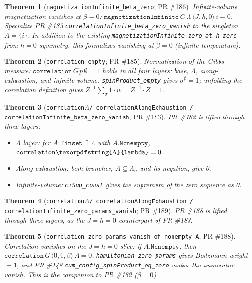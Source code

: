 \documentclass[a4paper,11pt]{article}
\newtheorem{theorem}{Theorem}
\newcommand{\LeanLambda}{\texorpdfstring{\ensuremath{\Lambda}}{Lambda}}
\begin{document}
\begin{theorem}[\texttt{magnetizationInfinite\_beta\_zero}; PR \#186]
Infinite-volume magnetization vanishes at $\beta = 0$:
$\texttt{magnetizationInfinite}\,G\,\Lambda\,\langle J, h, 0\rangle\,i = 0$.
Specialize PR \#183 \texttt{correlationInfinite\_beta\_zero\_vanish} to the
singleton $A = \{i\}$. In addition to the existing
\texttt{magnetizationInfinite\_zero\_at\_h\_zero} from $h=0$ symmetry, this
formalizes vanishing at $\beta = 0$ (infinite temperature).
\end{theorem}

\begin{theorem}[\texttt{correlation\_empty}; PR \#185]
Normalization of the Gibbs measure:
$\texttt{correlation}\,G\,p\,\emptyset = 1$
holds in all four layers: base, $\Lambda$, along-exhaustion, and
infinite-volume. \texttt{spinProduct\_empty} gives $\sigma^\emptyset = 1$;
unfolding the correlation definition gives
$Z^{-1} \sum_\sigma 1 \cdot w = Z^{-1} \cdot Z = 1$.
\end{theorem}

\begin{theorem}[\texttt{correlation\LeanLambda / correlationAlongExhaustion / correlationInfinite\_beta\_zero\_vanish}; PR \#183]
PR \#182 is lifted through three layers:
\begin{itemize}
\item $\Lambda$ layer: for $A : \texttt{Finset}\,\uparrow\Lambda$ with
  $A.\texttt{Nonempty}$, $\texttt{correlation\LeanLambda} = 0$.
\item Along-exhaustion: both branches, $A \subseteq \Lambda_n$ and its
  negation, give 0.
\item Infinite-volume: \texttt{ciSup\_const} gives the supremum of the
  zero sequence as 0.
\end{itemize}
\end{theorem}

\begin{theorem}[\texttt{correlation\LeanLambda / correlationAlongExhaustion / correlationInfinite\_zero\_params\_vanish}; PR \#189]
PR \#188 is lifted through three layers, as the $J=h=0$ counterpart of
PR \#183.
\end{theorem}

\begin{theorem}[\texttt{correlation\_zero\_params\_vanish\_of\_nonempty\_A}; PR \#188]
Correlation vanishes on the $J = h = 0$ slice: if $A.\texttt{Nonempty}$, then
$\texttt{correlation}\,G\,\langle 0, 0, \beta\rangle\,A = 0$.
\texttt{hamiltonian\_zero\_params} gives Boltzmann weight $= 1$, and
PR \#148 \texttt{sum\_config\_spinProduct\_eq\_zero} makes the numerator
vanish.
This is the companion to PR \#182 ($\beta = 0$).
\end{theorem}
\end{document}
